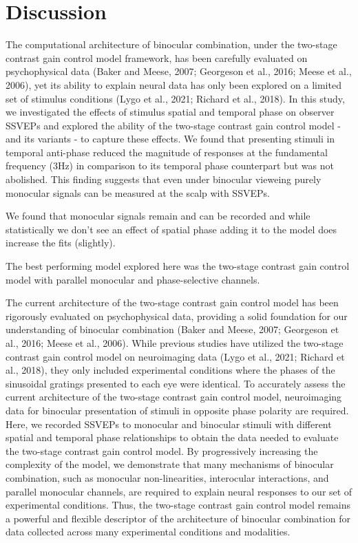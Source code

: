 \documentclass[
  12pt,
]{article}
\begin{document}
\section{Discussion}\label{discussion}

The computational architecture of binocular combination, under the
two-stage contrast gain control model framework, has been carefully
evaluated on psychophysical data (Baker and Meese, 2007; Georgeson et
al., 2016; Meese et al., 2006), yet its ability to explain neural data
has only been explored on a limited set of stimulus conditions (Lygo et
al., 2021; Richard et al., 2018). In this study, we investigated the
effects of stimulus spatial and temporal phase on observer SSVEPs and
explored the ability of the two-stage contrast gain control model - and
its variants - to capture these effects. We found that presenting
stimuli in temporal anti-phase reduced the magnitude of responses at the
fundamental frequency (3Hz) in comparison to its temporal phase
counterpart but was not abolished. This finding suggests that even under
binocular vieweing purely monocular signals can be measured at the scalp
with SSVEPs.

We found that monocular signals remain and can be recorded and while
statistically we don't see an effect of spatial phase adding it to the
model does increase the fits (slightly).

The best performing model explored here was the two-stage contrast gain
control model with parallel monocular and phase-selective channels.

The current architecture of the two-stage contrast gain control model
has been rigorously evaluated on psychophysical data, providing a solid
foundation for our understanding of binocular combination (Baker and
Meese, 2007; Georgeson et al., 2016; Meese et al., 2006). While previous
studies have utilized the two-stage contrast gain control model on
neuroimaging data (Lygo et al., 2021; Richard et al., 2018), they only
included experimental conditions where the phases of the sinusoidal
gratings presented to each eye were identical. To accurately assess the
current architecture of the two-stage contrast gain control model,
neuroimaging data for binocular presentation of stimuli in opposite
phase polarity are required. Here, we recorded SSVEPs to monocular and
binocular stimuli with different spatial and temporal phase
relationships to obtain the data needed to evaluate the two-stage
contrast gain control model. By progressively increasing the complexity
of the model, we demonstrate that many mechanisms of binocular
combination, such as monocular non-linearities, interocular
interactions, and parallel monocular channels, are required to explain
neural responses to our set of experimental conditions. Thus, the
two-stage contrast gain control model remains a powerful and flexible
descriptor of the architecture of binocular combination for data
collected across many experimental conditions and modalities.
\end{document}
